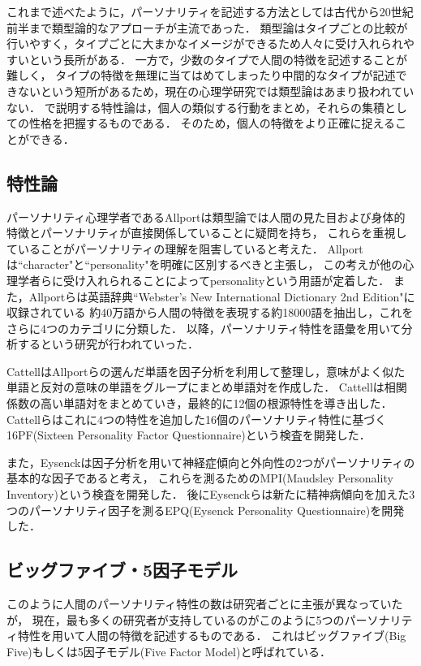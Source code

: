 これまで述べたように，パーソナリティを記述する方法としては古代から20世紀前半まで類型論的なアプローチが主流であった．
類型論はタイプごとの比較が行いやすく，タイプごとに大まかなイメージができるため人々に受け入れられやすいという長所がある．
一方で，少数のタイプで人間の特徴を記述することが難しく，
タイプの特徴を無理に当てはめてしまったり中間的なタイプが記述できないという短所があるため，現在の心理学研究では類型論はあまり扱われていない．
で説明する特性論は，個人の類似する行動をまとめ，それらの集積としての性格を把握するものである．
そのため，個人の特徴をより正確に捉えることができる．

\subsection{特性論}
\label{sec:trait}
パーソナリティ心理学者であるAllportは類型論では人間の見た目および身体的特徴とパーソナリティが直接関係していることに疑問を持ち，
これらを重視していることがパーソナリティの理解を阻害していると考えた．
Allport\cite{allport}は“character"と“personality"を明確に区別するべきと主張し，
この考えが他の心理学者らに受け入れられることによってpersonalityという用語が定着した．
また，Allportら\cite{allport_odbert}は英語辞典“Webster's New International Dictionary 2nd Edition"に収録されている
約40万語から人間の特徴を表現する約18000語を抽出し，これをさらに4つのカテゴリに分類した．
以降，パーソナリティ特性を語彙を用いて分析するという研究が行われていった．

Cattell\cite{cattell}はAllportらの選んだ単語を因子分析を利用して整理し，意味がよく似た単語と反対の意味の単語をグループにまとめ単語対を作成した．
Cattellは相関係数の高い単語対をまとめていき，最終的に12個の根源特性を導き出した．
Cattellら\cite{16pf}はこれに4つの特性を追加した16個のパーソナリティ特性に基づく16PF(Sixteen Personality Factor Questionnaire)という検査を開発した．

また，Eysenck\cite{mpi}は因子分析を用いて神経症傾向と外向性の2つがパーソナリティの基本的な因子であると考え，
これらを測るためのMPI(Maudsley Personality Inventory)という検査を開発した．
後にEysenckら\cite{epq}は新たに精神病傾向を加えた3つのパーソナリティ因子を測るEPQ(Eysenck Personality Questionnaire)を開発した．

\subsection{ビッグファイブ・5因子モデル}
このように人間のパーソナリティ特性の数は研究者ごとに主張が異なっていたが，
現在，最も多くの研究者が支持しているのがこのように5つのパーソナリティ特性を用いて人間の特徴を記述するものである．
これはビッグファイブ(Big Five)もしくは5因子モデル(Five Factor Model)と呼ばれている．

